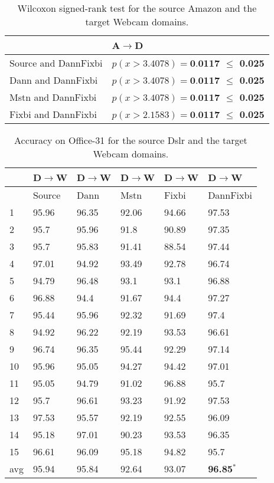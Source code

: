 \begin{table}[H]
\centering
\caption{Wilcoxon signed-rank test for the source Amazon and the target Webcam domains.}
\label{tab:AW_wil}
\begin{tabular}{|l|l|}
\hline
 & A$\rightarrow$D \\ \hline
Source and DannFixbi & \textbf{$p(x > 3.4078) = \textbf{0.0117}$ $\leq$ 0.025} \\ \hline
Dann and DannFixbi & \textbf{$p(x > 3.4078) = \textbf{0.0117} $ $\leq$ 0.025} \\ \hline
Mstn and DannFixbi & \textbf{$p(x > 3.4078) = \textbf{0.0117}$ $\leq$ 0.025} \\ \hline
Fixbi and DannFixbi & \textbf{$p(x > 2.1583) = \textbf{0.0117}$ $\leq$ 0.025} \\ \hline
\end{tabular}
\end{table} 

\begin{table}[H]
\centering
\caption{Accuracy on Office-31 for the source Dslr and the target Webcam domains.}
\label{tab:DW}
\begin{tabular}{|p{2cm}|p{2cm}|p{2cm}|p{2cm}|p{2cm}|p{2cm}|}
\hline
   & D$\rightarrow$W & D$\rightarrow$W & D$\rightarrow$W & D$\rightarrow$W & D$\rightarrow$W \\ \hline
 & Source & Dann & Mstn & Fixbi & DannFixbi \\ \hline
1 & 95.96 & 96.35 & 92.06 & 94.66 & 97.53 \\ \hline
2 & 95.7 & 95.96 & 91.8 & 90.89 & 97.35 \\ \hline
3 & 95.7 & 95.83 & 91.41 & 88.54 & 97.44 \\ \hline
4 & 97.01 & 94.92 & 93.49 & 92.78 & 96.74 \\ \hline
5 & 94.79 & 96.48 & 93.1 & 93.1 & 96.88 \\ \hline
6 & 96.88 & 94.4 & 91.67 & 94.4 & 97.27 \\ \hline
7 & 95.44 & 95.96 & 92.32 & 91.69 & 97.4 \\ \hline
8 & 94.92 & 96.22 & 92.19 & 93.53 & 96.61 \\ \hline
9 & 96.74 & 96.35 & 95.44 & 92.29 & 97.14 \\ \hline
10 & 95.96 & 95.05 & 94.27 & 94.42 & 97.01 \\ \hline
11 & 95.05 & 94.79 & 91.02 & 96.88 & 95.7 \\ \hline
12 & 95.7 & 96.61 & 93.23 & 91.92 & 97.53 \\ \hline
13 & 97.53 & 95.57 & 92.19 & 92.55 & 96.09 \\ \hline
14 & 95.18 & 97.01 & 90.23 & 93.53 & 96.35 \\ \hline
15 & 96.61 & 96.09 & 95.18 & 94.82 & 95.7 \\ \hline
avg & 95.94 & 95.84 & 92.64 & 93.07 & \textbf{96.85}$^*$ \\ \hline
\end{tabular}
\end{table}

